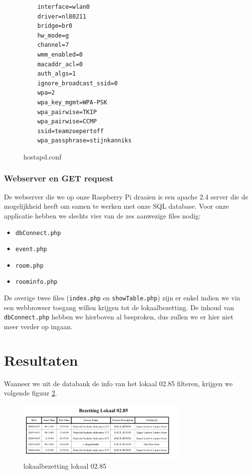 \documentclass[a4paper,kul]{kulakarticle} %
\begin{document}
\begin{figure}[!h]
	\begin{verbatim}
	interface=wlan0
	driver=nl80211
	bridge=br0
	hw_mode=g
	channel=7
	wmm_enabled=0
	macaddr_acl=0
	auth_algs=1
	ignore_broadcast_ssid=0
	wpa=2
	wpa_key_mgmt=WPA-PSK
	wpa_pairwise=TKIP
	wpa_pairwise=CCMP
	ssid=teamzoepertoff
	wpa_passphrase=stijnkanniks
	\end{verbatim}
	\caption{hostapd.conf}
	\label{fig:hostapd}
\end{figure}
\newpage
\subsubsection{Webserver en GET request}
De webserver die we op onze Raspberry Pi draaien is een apache 2.4 server die de mogelijkheid heeft om samen te werken met onze SQL database. Voor onze applicatie hebben we slechts vier van de zes aanwezige files nodig: 
\begin{itemize}
	\item \verb|dbConnect.php|
	\item \verb|event.php|
	\item \verb|room.php|
	\item \verb|roominfo.php|
\end{itemize}
De overige twee files (\verb|index.php| en \verb|showTable.php|) zijn er enkel indien we via een webbrowser toegang willen krijgen tot de lokaalbezetting. De inhoud van \verb|dbConnect.php| hebben we hierboven al besproken, dus zullen we er hier niet meer verder op ingaan.
\newpage

\section{Resultaten}

Wanneer we uit de databank de info van het lokaal 02.85 filteren, krijgen we volgende figuur \ref{fig:vboutput}.

\begin{figure}
	\centering
	\includegraphics[width=0.75\textwidth]{vbDatabank}
	\caption{lokaalbezetting lokaal 02.85}
	\label{fig:vboutput}
\end{figure}
	
\end{document}
